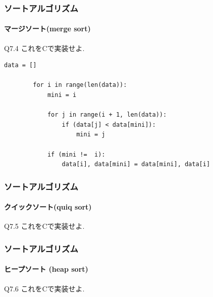 \documentclass[dvipdfmx]{beamer}
\begin{document}
\begin{frame}[t, fragile]
    \frametitle{ソートアルゴリズム}
    \framesubtitle{マージソート(merge sort)}
    \begin{itembox}[l]{Q7.4}
        これをCで実装せよ.
    \end{itembox}
    \begin{lstlisting}[gobble=8, caption=mergeSort.py, label=mergeSort]
        data = []

        for i in range(len(data)):
            mini = i

            for j in range(i + 1, len(data)):
                if (data[j] < data[mini]):
                    mini = j

            if (mini !=  i):
                data[i], data[mini] = data[mini], data[i]
    \end{lstlisting}
\end{frame}

\begin{frame}[t, fragile]
    \frametitle{ソートアルゴリズム}
    \framesubtitle{クイックソート(quiq sort)}
    \begin{itembox}[l]{Q7.5}
        これをCで実装せよ.
    \end{itembox}
\end{frame}

\begin{frame}[t, fragile]
    \frametitle{ソートアルゴリズム}
    \framesubtitle{ヒープソート (heap sort)}
    \begin{itembox}[l]{Q7.6}
        これをCで実装せよ.
    \end{itembox}
\end{frame}
\end{document}
